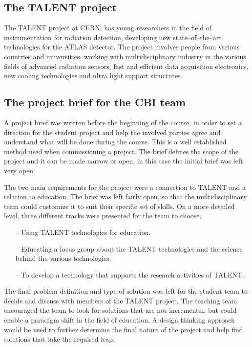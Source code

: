 \documentclass[english,12pt,a4paper,dvips]{article}
\begin{document}
\subsection{The TALENT project}

The TALENT project at CERN, has young researchers in the field of instrumentation for radiation detection, developing new state--of--the--art technologies for the ATLAS detector. The project involves people from various countries and universities, working with multidisciplinary industry in the various fields of advanced radiation sensors, fast and efficient data acquisition electronics, new cooling technologies and ultra light support structures.



\subsection{The project brief for the CBI team}

A project brief was written before the beginning of the course, in order to set a direction for the student project and help the involved parties agree and understand what will be done during the course. This is a well established method used when commissioning a project. The brief defines the scope of the project and it can be made narrow or open, in this case the initial brief was left very open.

The two main requirements for the project were a connection to TALENT and a relation to education. The brief was left fairly open, so that the multidisciplinary team could customize it to suit their specific set of skills. On a more detailed level, three different tracks were presented for the team to choose.

\begin{itemize}
\item[--]Using TALENT technologies for education.
\item[--]Educating a focus group about the TALENT technologies and the science behind the various technologies.
\item[--]To develop a technology that supports the research activities of TALENT.
\end{itemize}

The final problem definition and type of solution was left for the student team to decide and discuss with members of the TALENT project. The teaching team encouraged the team to look for solutions that are not incremental, but could enable a paradigm shift in the field of education. A design thinking approach would be used to further determine the final nature of the project and help find solutions that take the required leap.
\end{document}
